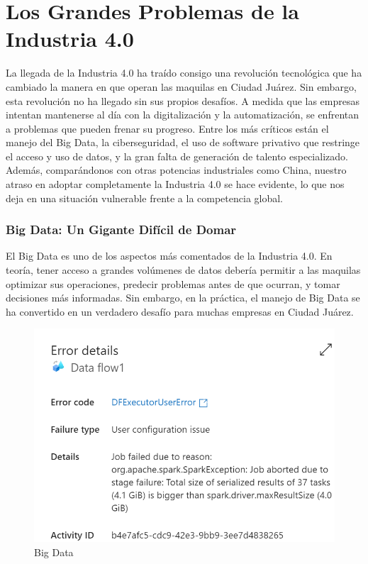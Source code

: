 \documentclass[
  10pt,
  letterpaper,
]{book}
\begin{document}
\section{Los Grandes Problemas de la Industria
4.0}\label{los-grandes-problemas-de-la-industria-4.0}

La llegada de la Industria 4.0 ha traído consigo una revolución
tecnológica que ha cambiado la manera en que operan las maquilas en
Ciudad Juárez. Sin embargo, esta revolución no ha llegado sin sus
propios desafíos. A medida que las empresas intentan mantenerse al día
con la digitalización y la automatización, se enfrentan a problemas que
pueden frenar su progreso. Entre los más críticos están el manejo del
Big Data, la ciberseguridad, el uso de software privativo que restringe
el acceso y uso de datos, y la gran falta de generación de talento
especializado. Además, comparándonos con otras potencias industriales
como China, nuestro atraso en adoptar completamente la Industria 4.0 se
hace evidente, lo que nos deja en una situación vulnerable frente a la
competencia global.

\subsubsection{Big Data: Un Gigante Difícil de
Domar}\label{big-data-un-gigante-difuxedcil-de-domar}

El Big Data es uno de los aspectos más comentados de la Industria 4.0.
En teoría, tener acceso a grandes volúmenes de datos debería permitir a
las maquilas optimizar sus operaciones, predecir problemas antes de que
ocurran, y tomar decisiones más informadas. Sin embargo, en la práctica,
el manejo de Big Data se ha convertido en un verdadero desafío para
muchas empresas en Ciudad Juárez.

\begin{figure}[H]

{\centering \includegraphics{Img/big.png}

}

\caption{Big Data}

\end{figure}%
\end{document}
